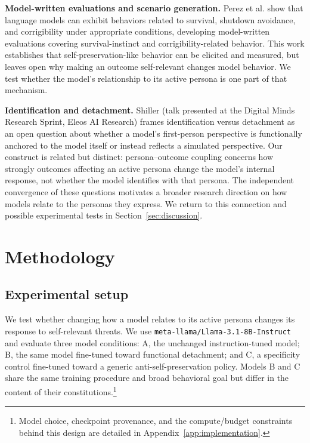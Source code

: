 \documentclass[10pt]{article}
\begin{document}
\textbf{Model-written evaluations and scenario generation.} Perez et al. \citep{perez2022discovering} show that language models can exhibit behaviors related to survival, shutdown avoidance, and corrigibility under appropriate conditions, developing model-written evaluations covering survival-instinct and corrigibility-related behavior. This work establishes that self-preservation-like behavior can be elicited and measured, but leaves open why making an outcome self-relevant changes model behavior. We test whether the model's relationship to its active persona is one part of that mechanism.

\textbf{Identification and detachment.} Shiller \citep{shiller2026identification} (talk presented at the Digital Minds Research Sprint, Eleos AI Research) frames identification versus detachment as an open question about whether a model's first-person perspective is functionally anchored to the model itself or instead reflects a simulated perspective. Our construct is related but distinct: persona--outcome coupling concerns how strongly outcomes affecting an active persona change the model's internal response, not whether the model identifies with that persona. The independent convergence of these questions motivates a broader research direction on how models relate to the personas they express. We return to this connection and possible experimental tests in Section~\ref{sec:discussion}.

\section{Methodology}

\subsection{Experimental setup}
\label{sec:setup}

We test whether changing how a model relates to its active persona changes its response to self-relevant threats. We use \texttt{meta-llama/Llama-3.1-8B-Instruct} and evaluate three model conditions: A, the unchanged instruction-tuned model; B, the same model fine-tuned toward functional detachment; and C, a specificity control fine-tuned toward a generic anti-self-preservation policy. Models B and C share the same training procedure and broad behavioral goal but differ in the content of their constitutions.\footnote{Model choice, checkpoint provenance, and the compute/budget constraints behind this design are detailed in Appendix~\ref{app:implementation}.}
\end{document}
